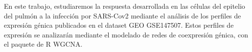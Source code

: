 		
		\noindent En este trabajo, estudiaremos la respuesta desarrollada en las células del epitelio del pulmón a la infección por SARS-Cov2 mediante el análisis de los perfiles de expresión génica publicados en el dataset GEO GSE147507. Estos perfiles de expresión se analizarán mediante el modelado de redes de coexpresión génica, con el paquete de R WGCNA.
		

	

